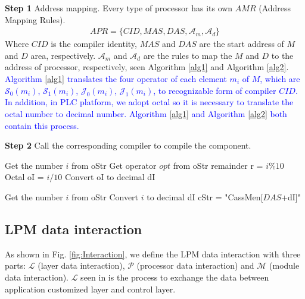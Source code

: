 \documentclass[journal,UTF8]{IEEEtran}
\begin{document}
\textbf{Step 1} Address mapping. Every type of processor has its own $AMR$ (Address Mapping Rules).
 \begin{eqnarray}
  APR = \{CID, MAS, DAS, \mathcal{A}_m, \mathcal{A}_d\}
 \end{eqnarray}
 Where $CID$ is the compiler identity, $MAS$ and $DAS$ are the start address of $M$ and $D$ area, respectively. $\mathcal{A}_m$ and $\mathcal{A}_d$ are the rules to map the $M$ and $D$ to the address of processor, respectively, seen Algorithm \ref{alg1} and Algorithm \ref{alg2}. \textcolor{blue}{Algorithm \ref{alg1} translates the four operator of each element $m_i$ of $M$, which are $\mathcal{S}_0(m_i)$, $\mathcal{S}_1(m_i)$, $\mathcal{J}_0(m_i)$, $\mathcal{J}_1(m_i)$, to recognizable form of compiler $CID$. In addition, in PLC platform, we adopt octal so it is necessary to translate the octal number to decimal number. Algorithm \ref{alg1} and Algorithm \ref{alg2} both contain this process.
 } 
 
\textbf{Step 2} Call the corresponding compiler to compile the component.


\begin{algorithm}
	\label{alg1}
	\caption{$\mathcal{A}_m$}%
	Get the number $i$ from oStr\; 
	Get operator $opt$ from oStr\;
	remainder r = $i\%10$\;
	Octal oI =  $i/10$\;
	Convert oI to decimal dI\; 
	\textcolor{blue}{}
\end{algorithm}
\begin{algorithm}
	\label{alg2}
	\caption{$\mathcal{A}_d$}%
	Get the number $i$ from oStr\; 
	Convert $i$ to decimal dI\; 
	cStr = "CassMen[$DAS$+dI]"\;
\end{algorithm}


 
 \subsection{LPM data interaction}
 As shown in Fig. \ref{fig:Interaction}, we define the LPM data interaction with three parts: $\mathcal{L}$ (layer data interaction), $\mathcal{P}$ (processor data interaction) and $\mathcal{M}$ (module data interaction). $\mathcal{L}$ seen in \cite{WuA} is the process to exchange the data between application customized layer and control layer.
\end{document}
